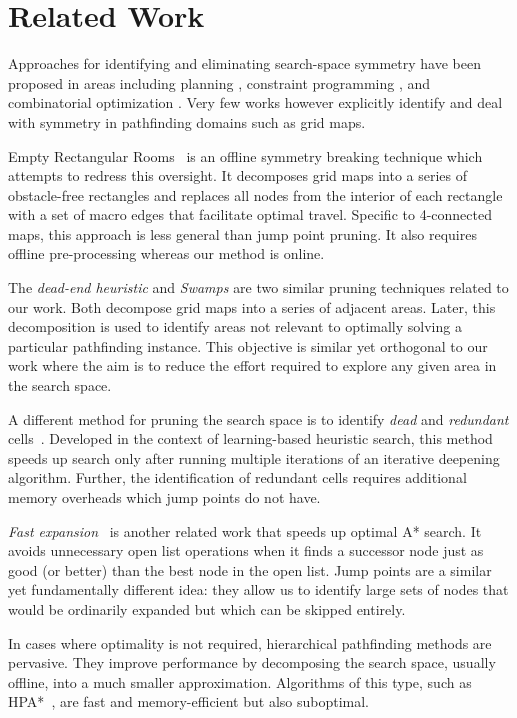 \section{Related Work}
\label{sec:relatedwork}
 Approaches for identifying and eliminating search-space symmetry have been
proposed in areas including planning \cite{fox99}, constraint programming
\cite{gent00}, and combinatorial optimization \cite{fukunaga08}. 
Very few works however explicitly identify and deal with symmetry in pathfinding
domains such as grid maps. 

Empty Rectangular Rooms~\cite{harabor10} is an offline symmetry breaking technique
which attempts to redress this oversight. 
It decomposes grid maps into a series of obstacle-free rectangles and replaces all nodes 
from the interior of each rectangle with 
a set of macro edges that facilitate optimal travel. 
Specific to 4-connected maps, this approach is less general than
jump point pruning. It also requires offline pre-processing whereas our
method is online.

The \emph{dead-end heuristic} \cite{bjornsson06} and \emph{Swamps} \cite{pochter10}
are two similar pruning techniques related to our work.
Both decompose grid maps into a series of adjacent areas. Later, this decomposition
is used to identify areas not relevant to optimally solving a particular
pathfinding instance.
This objective is similar yet orthogonal to our work where
the aim is to reduce the effort required to explore any given area in the search
space.

A different method for pruning the search space is to identify \emph{dead} and
\emph{redundant} cells~\cite{sturtevant10}.  Developed in the context of
learning-based heuristic search, this method speeds up search only after running
multiple iterations of an iterative deepening algorithm.  Further, the
identification of redundant cells requires additional memory overheads which
jump points do not have.

\emph{Fast expansion}~\cite{sun09} is another related work that speeds up
optimal A* search. It avoids unnecessary open list operations when it finds a
successor node just as good (or better) than the best node in the open list.
Jump points are a similar yet fundamentally different idea: they allow us to
identify large sets of nodes that would be ordinarily expanded but which can be
skipped entirely.
 
In cases where optimality is not required, hierarchical pathfinding methods
are pervasive.  They improve performance by decomposing the
search space, usually offline, into a much smaller approximation.  Algorithms
of this type, such as HPA*~\cite{botea04}, are  fast and
memory-efficient but also suboptimal.
